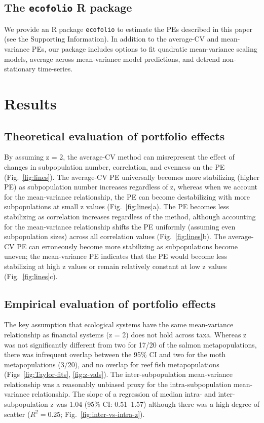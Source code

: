 \subsection{The \texttt{ecofolio} R package}

We provide an R package \texttt{ecofolio} to estimate the PEs described in this
paper (see the Supporting Information). In addition to the average-CV and
mean-variance PEs, our package includes options to fit quadratic mean-variance
scaling models, average across mean-variance model predictions, and detrend
non-stationary time-series.

\section{Results}

\subsection{Theoretical evaluation of portfolio effects}

By assuming z = 2, the average-CV method can misrepresent the effect of changes
in subpopulation number, correlation, and evenness on the PE
(Fig.~\ref{fig:lines}). The average-CV PE universally becomes more stabilizing
(higher PE) as subpopulation number increases regardless of z, whereas
when we account for the mean-variance relationship, the PE can become
destabilizing with more subpopulations at small z values
(Fig.~\ref{fig:lines}a). The PE becomes less stabilizing as correlation
increases regardless of the method, although accounting for the mean-variance
relationship shifts the PE uniformly (assuming even subpopulation sizes) across
all correlation values (Fig.~\ref{fig:lines}b). The average-CV PE can
erroneously become more stabilizing as subpopulations become uneven; the
mean-variance PE indicates that the PE would become less stabilizing at high z
values or remain relatively constant at low z values (Fig.~\ref{fig:lines}c).

\subsection{Empirical evaluation of portfolio effects}

The key assumption that ecological systems have the same mean-variance
relationship as financial systems (z = 2) does not hold across
taxa. Whereas z was not significantly different from two for
17/20 of the salmon metapopulations,
there was infrequent overlap between the 95\% CI and two for the moth
metapopulations (3/20), and no overlap for
reef fish metapopulations (Figs~\ref{fig:Taylor-fits}, \ref{fig:z-vals}). The
inter-subpopulation mean-variance relationship was a reasonably unbiased proxy
for the intra-subpopulation mean-variance relationship. The slope of a
regression of median intra- and inter-subpopulation z was 1.04 (95\% CI:
0.51--1.57) although there was a high degree of scatter ($R^2 = 0.25$;
Fig.~\ref{fig:inter-vs-intra-z}).

